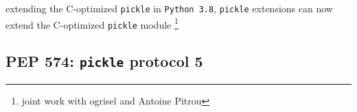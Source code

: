 \documentclass[13pt, usenames,dvipsnames]{beamer} %
\newcommand{\mycode}[2][\tiny] {\texttt{#2}}
\begin{document}
    \begin{frame}[fragile]{extending the C-optimized \mycode[\small]{pickle}}
        in \mycode{Python 3.8}, \mycode{pickle} extensions can now extend the
        C-optimized \mycode{pickle} module \footnote{\tiny joint work with ogrisel and Antoine Pitrou}
    \end{frame}

\subsection{PEP 574: \mycode{pickle} protocol 5}
\end{document}
